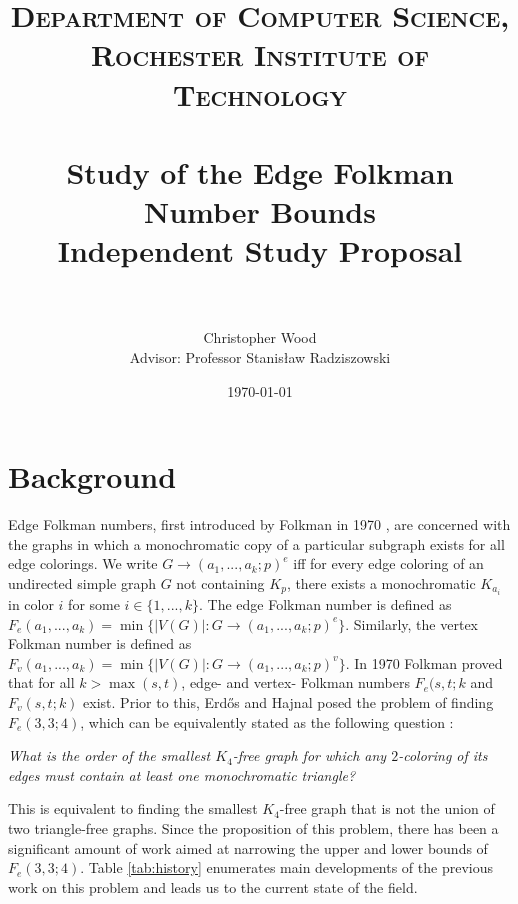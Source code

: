 \documentclass[paper=a4, fontsize=11pt]{scrartcl} %
\title{	
\normalfont \normalsize 
\textsc{Department of Computer Science, Rochester Institute of Technology} \\ [25pt] %
\horrule{2pt} \\[0.4cm] %
\huge Study of the Edge Folkman Number Bounds \\ 
\Large Independent Study Proposal \\
\horrule{2pt} \\[0.5cm] %
}
\author{Christopher Wood \\ Advisor: Professor Stanis{\l}aw Radziszowski} %
\date{\normalsize\today} %
\begin{document}
\maketitle %

\section{Background}
Edge Folkman numbers, first introduced by Folkman in 1970 \cite{Folkman}, are concerned
with the graphs in which a monochromatic copy of a particular subgraph exists for all edge colorings. 
We write $G \to (a_1, ..., a_k; p)^e$ iff for every edge coloring of an undirected simple graph $G$ not 
containing $K_p$, there exists a monochromatic $K_{a_{i}}$ in color $i$ for some $i \in \{1, ..., k\}$. 
The edge Folkman number is defined as $F_e(a_1, ..., a_k) = \min\{|V(G)| : G \to (a_1, ..., a_k; p)^e\}$.
Similarly, the vertex Folkman number is defined as $F_v(a_1, ..., a_k) = \min\{|V(G)| : G \to (a_1, ..., a_k; p)^v\}$.
In 1970 Folkman proved that for all $k > \max(s,t)$, edge- and vertex- Folkman numbers $F_e(s,t;k$
and $F_v(s,t;k)$ exist. Prior to this, Erd\H{o}s and Hajnal posed the problem of finding $F_e(3,3;4)$, which
can be equivalently stated as the following question \cite{Erdos01}: 

\noindent \emph{What is the order of the smallest $K_4$-free graph for which any $2$-coloring of 
its edges must contain at least one monochromatic triangle?}

This is equivalent to finding the smallest $K_4$-free graph that is not the union of two 
triangle-free graphs. Since the proposition of this problem, there has been a significant
amount of work aimed at narrowing the upper and lower bounds of $F_e(3,3;4)$. 
Table \ref{tab:history} enumerates main developments of the previous work on this problem 
and leads us to the current state of the field.
\end{document}
